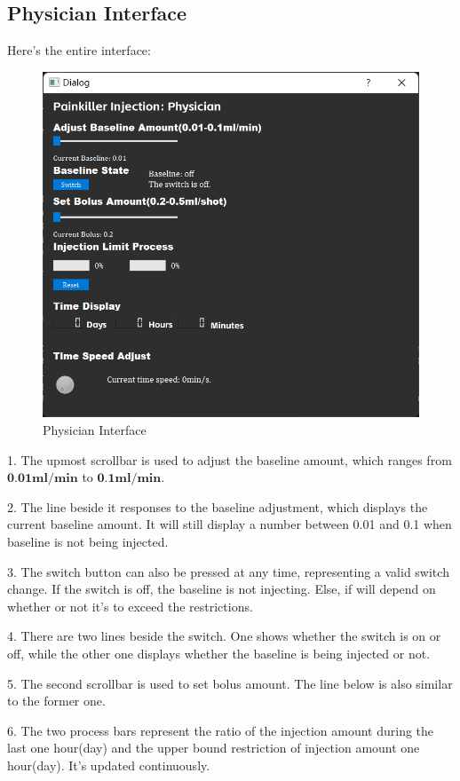 \documentclass{article}
\begin{document}
\subsection{Physician Interface}
Here's the entire interface:
\begin{figure}[htbp]
  \centering
  \includegraphics{img/physician_ui.png}
  \caption{Physician Interface}
\end{figure}

1. The upmost scrollbar is used to adjust the baseline amount, which ranges from $\textbf{0.01ml/min}$ to $\textbf{0.1ml/min}$.

2. The line beside it responses to the baseline adjustment, which displays the current baseline amount. It will still display a number between 0.01 and 0.1 when baseline is not being injected.

3. The switch button can also be pressed at any time, representing a valid switch change. If the switch is off, the baseline is not injecting. Else, if will depend on whether or not it's to exceed the restrictions.

4. There are two lines beside the switch. One shows whether the switch is on or off, while the other one displays whether the baseline is being injected or not.

5. The second scrollbar is used to set bolus amount. The line below is also similar to the former one.

6. The two process bars represent the ratio of the injection amount during the last one hour(day) and the upper bound restriction of injection amount one hour(day). It's updated continuously.
\end{document}
